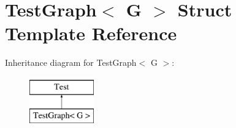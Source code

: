 \hypertarget{structTestGraph}{\section{Test\-Graph$<$ G $>$ Struct Template Reference}
\label{structTestGraph}
}
Inheritance diagram for Test\-Graph$<$ G $>$\-:\begin{figure}[H]
\begin{center}
\leavevmode
\includegraphics[height=2.000000cm]{structTestGraph}
\end{center}
\end{figure}
